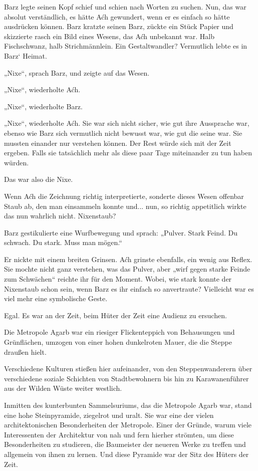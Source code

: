 Barz legte seinen Kopf schief und schien nach Worten zu suchen. Nun, das war absolut verständlich, es hätte Aćh gewundert, wenn er es einfach so hätte ausdrücken können. Barz kratzte seinen Barz, zückte ein Stück Papier und skizzierte rasch ein Bild eines Wesens, das Aćh unbekannt war. Halb Fischschwanz, halb Strichmännlein. Ein Gestaltwandler? Vermutlich lebte es in Barz‘ Heimat.

„Nixe“, sprach Barz, und zeigte auf das Wesen.

„Nixe“, wiederholte Aćh.

„Nixe“, wiederholte Barz.

„Nixe“, wiederholte Aćh. Sie war sich nicht sicher, wie gut ihre Aussprache war, ebenso wie Barz sich vermutlich nicht bewusst war, wie gut die seine war. Sie mussten einander nur verstehen können. Der Rest würde sich mit der Zeit ergeben. Falls sie tatsächlich mehr als diese paar Tage miteinander zu tun haben würden.

Das war also die Nixe.

Wenn Aćh die Zeichnung richtig interpretierte, sonderte dieses Wesen offenbar Staub ab, den man einsammeln konnte und... nun, so richtig appetitlich wirkte das nun wahrlich nicht. Nixenstaub?

Barz gestikulierte eine Wurfbewegung und sprach: „Pulver. Stark Feind. Du schwach. Du stark. Muss man mögen.“

Er nickte mit einem breiten Grinsen. Aćh grinste ebenfalls, ein wenig aus Reflex. Sie mochte nicht ganz verstehen, was das Pulver, aber „wirf gegen starke Feinde zum Schwächen“ reichte ihr für den Moment. Wobei, wie stark konnte der Nixenstaub schon sein, wenn Barz es ihr einfach so anvertraute? Vielleicht war es viel mehr eine symbolische Geste.

Egal. Es war an der Zeit, beim Hüter der Zeit eine Audienz zu ersuchen.



\trennzeichen



Die Metropole Agarb war ein riesiger Flickenteppich von Behausungen und Grünflächen, umzogen von einer hohen dunkelroten Mauer, die die Steppe draußen hielt.

Verschiedene Kulturen stießen hier aufeinander, von den Steppenwanderern über verschiedene soziale Schichten von Stadtbewohnern bis hin zu Karawanenführer aus der Wilden Wüste weiter westlich.

Inmitten des kunterbunten Sammelsuriums, das die Metropole Agarb war, stand eine hohe Steinpyramide, ziegelrot und uralt. Sie war eine der vielen architektonischen Besonderheiten der Metropole. Einer der Gründe, warum viele Interessenten der Architektur von nah und fern hierher strömten, um diese Besonderheiten zu studieren, die Baumeister der neueren Werke zu treffen und allgemein von ihnen zu lernen. Und diese Pyramide war der Sitz des Hüters der Zeit.

